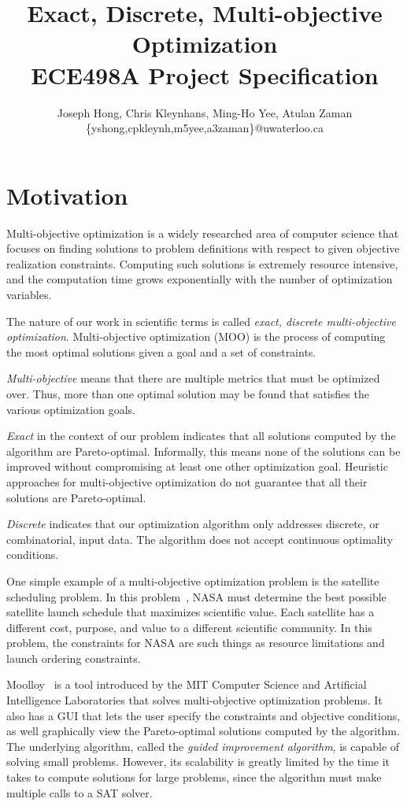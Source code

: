 \documentclass[11pt]{article}
\title{{\Large Exact, Discrete, Multi-objective Optimization} \\ ECE498A Project Specification}
\author{Joseph Hong, Chris Kleynhans, Ming-Ho Yee, Atulan Zaman \\
        \{yshong,cpkleynh,m5yee,a3zaman\}@uwaterloo.ca}
\theoremstyle{definition}
\begin{document}
\maketitle

\tableofcontents


\newpage

\section{Motivation}\label{sec:motivation}
Multi-objective optimization is a widely researched area of computer
science that focuses on finding solutions to problem definitions with
respect to given objective realization constraints. Computing such
solutions is extremely resource intensive, and the computation time
grows exponentially with the number of optimization variables.

The nature of our work in scientific terms is called \textit{exact,
discrete multi-objective optimization}. Multi-objective optimization
(MOO) is the process of computing the most optimal solutions given a
goal and a set of constraints.

\textit{Multi-objective} means that there are multiple metrics that
must be optimized over. Thus, more than one optimal solution may be
found that satisfies the various optimization goals.

\textit{Exact} in the context of our problem indicates that all
solutions computed by the algorithm are Pareto-optimal. Informally,
this means none of the solutions can be improved without compromising
at least one other optimization goal. Heuristic approaches for
multi-objective optimization do not guarantee that all their solutions
are Pareto-optimal.

\textit{Discrete} indicates that our optimization algorithm only
addresses discrete, or combinatorial, input data. The algorithm does
not accept continuous optimality conditions.

One simple example of a multi-objective optimization problem is the
satellite scheduling problem. In this problem~\cite{ref:nasa11}, NASA
must determine the best possible satellite launch schedule that
maximizes scientific value. Each satellite has a different cost,
purpose, and value to a different scientific community. In this
problem, the constraints for NASA are such things as resource
limitations and launch ordering constraints.

Moolloy~\cite{ref:Rayside09} is a tool introduced by the MIT Computer
Science and Artificial Intelligence Laboratories that solves
multi-objective optimization problems. It also has a GUI that lets the
user specify the constraints and objective conditions, as well
graphically view the Pareto-optimal solutions computed by the
algorithm. The underlying algorithm, called the \textit{guided
improvement algorithm}, is capable of solving small problems. However,
its scalability is greatly limited by the time it takes to compute
solutions for large problems, since the algorithm must make multiple
calls to a SAT solver.
\end{document}
